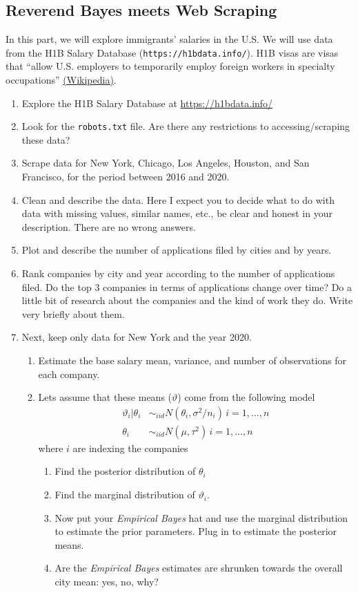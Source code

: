 \documentclass[12pt,onecolumn]{article}
\begin{document}
\subsection{Reverend Bayes meets Web Scraping}

In this part, we will explore immigrants' salaries in the U.S. We will use data from the H1B Salary Database (\texttt{https://h1bdata.info/}). H1B visas are visas that ``allow U.S. employers to temporarily employ foreign workers in specialty occupations'' \href{https://en.wikipedia.org/wiki/H-1B_visa}{(Wikipedia)}. 

\begin{enumerate}
  \item Explore the H1B Salary Database at \url{https://h1bdata.info/}
  \item Look for the \texttt{robots.txt} file. Are there any restrictions to accessing/scraping these data?
  \item Scrape data for New York, Chicago, Los Angeles, Houston, and San Francisco, for the period between 2016 and 2020.
  \item Clean and describe the data. Here I expect you to decide what to do with data with missing values, similar names, etc., be clear and honest in your description. There are no wrong answers.
  \item Plot and describe the number of applications filed by cities and by years.
  \item Rank companies by city and year according to the number of applications filed. Do the top 3 companies in terms of applications change over time?  Do a little bit of research about the companies and the kind of work they do. Write very briefly about them. 
  \item Next, keep only data for New York and the year 2020.
  \begin{enumerate}
	  \item Estimate the base salary mean, variance, and number of observations for each company.
	  \item Lets assume that these means ($\vartheta$) come from the following model
	  \begin{align}
	  \vartheta_i|\theta_i &\sim_{iid} N(\theta_i,\sigma^2/n_i) \, i=1,\dots,n \\
	  \theta_i &\sim_{iid} N(\mu,\tau^2) \, i=1,\dots,n 
	  \end{align}
	  \noindent where $i$ are indexing the companies
	  \begin{enumerate}
	  	\item Find the posterior distribution of $\theta_i$
	    \item Find the marginal distribution of $\vartheta_i$.
	    \item Now put your {\it Empirical Bayes} hat and use the marginal distribution to estimate the prior parameters. Plug in to estimate the posterior means. 
	    \item Are the {\it Empirical Bayes} estimates are shrunken towards the overall city mean: yes, no, why?
	  \end{enumerate}
  \end{enumerate}
\end{enumerate}
\end{document}
